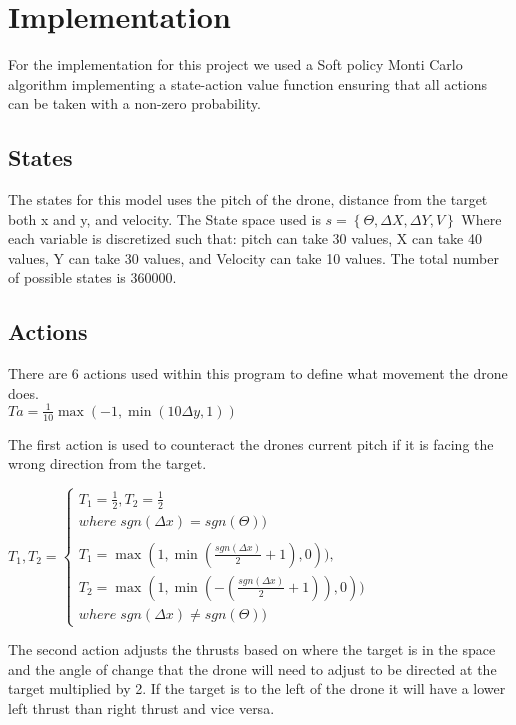 \section{Implementation}
For the implementation for this project we used a Soft policy Monti Carlo algorithm implementing a state-action value function ensuring that all actions can be taken with a non-zero probability. 

\subsection{States}
The states for this model uses the pitch of the drone, distance from the target both x and y, and velocity.
The State space used is 
$s={\left \{ \Theta, \Delta X, \Delta Y, V \right \}}$
Where each variable is discretized such that: pitch can take 30 values, X can take 40 values, Y can take 30 values, and Velocity can take 10 values. The total number of possible states is 360000.

\subsection{Actions}
There are 6 actions used within this program to define what movement the drone does.
\\
\begingroup\centering
$Ta =  \frac{1}{10}\max (-1,\min (10\Delta y,1))$

\endgroup

The first action is used to counteract the drones current pitch if it is facing the wrong direction from the target. 

\begingroup
$
T_1, T_2 = 
\left\{\begin{matrix}
    T_1 = \frac{1}{2}, T_2 = \frac{1}{2} & \\ where\;sgn(\Delta x) = sgn(\Theta ))

    \\ \\
    T_1 = \max (1,\min (\frac{sgn (\Delta x)}{2}+1),0)), \\
    T_2 = \max (1,\min (-(\frac{sgn (\Delta x)}{2}+1)),0)) \\
    where\;sgn(\Delta x) \neq sgn(\Theta ))
    \end{matrix}\right.$
\break
\endgroup

The second action adjusts the thrusts based on where the target is in the space and the angle of change that the drone will need to adjust to be directed at the target multiplied by 2. If the target is to the left of the drone it will have a lower left thrust than right thrust and vice versa. 

